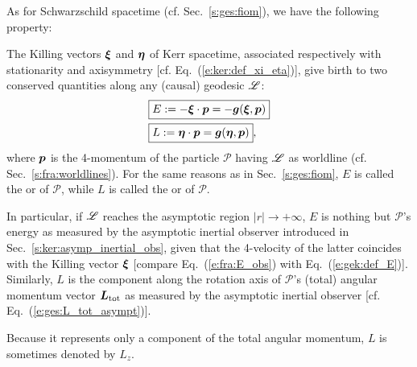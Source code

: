 As for Schwarzschild spacetime (cf. Sec.~\ref{s:ges:fiom}), we have the following
property:
\begin{prop}
The Killing vectors $\bm{\xi}$ and $\bm{\eta}$ of Kerr spacetime,
associated respectively with
stationarity and axisymmetry [cf. Eq.~(\ref{e:ker:def_xi_eta})],
give birth to two conserved quantities
along any (causal) geodesic $\mathscr{L}$:
\begin{subequations}
\label{e:gek:def_E_L}
\begin{align}
& \fbox{$\displaystyle E := - \bm{\xi}\cdot \bm{p} = - \bm{g}(\bm{\xi},\bm{p}) $} \label{e:gek:def_E} \\
& \fbox{$\displaystyle L := \bm{\eta}\cdot \bm{p} = \bm{g}(\bm{\eta},\bm{p}) $} , \label{e:gek:def_L}
\end{align}
\end{subequations}
where $\bm{p}$ is the 4-momentum of the particle $\mathscr{P}$
having $\mathscr{L}$ as worldline (cf. Sec.~\ref{s:fra:worldlines}).
For the same reasons as in Sec.~\ref{s:ges:fiom}, $E$ is called
the 
or  of $\mathscr{P}$,
while $L$ is called the 
or 
of $\mathscr{P}$.
\end{prop}
In particular, if $\mathscr{L}$ reaches the asymptotic region $|r|\to+\infty$,
$E$ is nothing but $\mathscr{P}$'s energy as measured by the asymptotic inertial
observer introduced in Sec.~\ref{s:ker:asymp_inertial_obs}, given that
the 4-velocity of the latter coincides with the Killing vector
$\bm{\xi}$
[compare Eq.~(\ref{e:fra:E_obs}) with Eq.~(\ref{e:gek:def_E})].
Similarly, $L$ is the component along the rotation axis of $\mathscr{P}$'s (total) angular momentum vector $\bm{L}_{\rm tot}$
as measured by the asymptotic inertial observer [cf. Eq.~(\ref{e:ges:L_tot_asympt})].

\begin{remark}
Because it represents only a component of the total angular momentum,
$L$ is sometimes denoted by $L_z$.
\end{remark}

